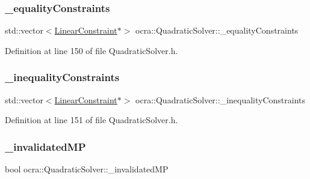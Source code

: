 \hypertarget{classocra_1_1QuadraticSolver_a0068a59d185c9556a0179dae5c5a2ff4}{}\label{classocra_1_1QuadraticSolver_a0068a59d185c9556a0179dae5c5a2ff4} 
\subsubsection{\texorpdfstring{\+\_\+equality\+Constraints}{\_equalityConstraints}}
{\footnotesize\ttfamily std\+::vector$<$\hyperlink{namespaceocra_ae8b87cf4099be3efc3b410019ad2046e}{Linear\+Constraint}$\ast$$>$ ocra\+::\+Quadratic\+Solver\+::\+\_\+equality\+Constraints\hspace{0.3cm}{\ttfamily [protected]}}



Definition at line 150 of file Quadratic\+Solver.\+h.

\hypertarget{classocra_1_1QuadraticSolver_af8ca3b3596faeedf97437b9b7d85a7f3}{}\label{classocra_1_1QuadraticSolver_af8ca3b3596faeedf97437b9b7d85a7f3} 
\subsubsection{\texorpdfstring{\+\_\+inequality\+Constraints}{\_inequalityConstraints}}
{\footnotesize\ttfamily std\+::vector$<$\hyperlink{namespaceocra_ae8b87cf4099be3efc3b410019ad2046e}{Linear\+Constraint}$\ast$$>$ ocra\+::\+Quadratic\+Solver\+::\+\_\+inequality\+Constraints\hspace{0.3cm}{\ttfamily [protected]}}



Definition at line 151 of file Quadratic\+Solver.\+h.

\hypertarget{classocra_1_1QuadraticSolver_aadb395a0722e77c9ea19ed8968916c0e}{}\label{classocra_1_1QuadraticSolver_aadb395a0722e77c9ea19ed8968916c0e} 
\subsubsection{\texorpdfstring{\+\_\+invalidated\+MP}{\_invalidatedMP}}
{\footnotesize\ttfamily bool ocra\+::\+Quadratic\+Solver\+::\+\_\+invalidated\+MP\hspace{0.3cm}{\ttfamily [protected]}}



